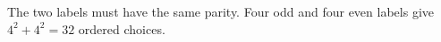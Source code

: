 The two labels must have the same parity. Four odd and four even labels give $4^2+4^2=\boxed{32}$ ordered choices.
